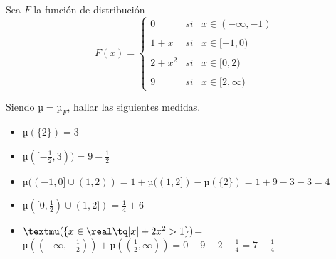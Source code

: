 \begin{problem}
Sea $F$ la función de distribución
\[F(x)=\left\{ \begin{array}{lcc}
             0 &   si  & x \in (-\infty, -1) \\
             \\ 1+x & si & x \in [-1, 0) \\
             \\ 2+x^2 & si & x \in [0, 2) \\
             \\ 9 &  si  & x \in [2, \infty)
             \end{array}
   \right.\]

Siendo $µ=µ_F$, hallar las siguientes medidas.
\solution
\begin{itemize}
\item $µ(\{2\}) = 3 $
\item $µ([-\frac{1}{2}, 3)) = 9 - \frac{1}{2}$
\item $µ((-1,0]\cup (1,2)) = 1 + µ((1,2]) - µ(\{2\}) = 1 + 9 -3 - 3 = 4$
\item $µ([0, \frac{1}{2}) \cup (1, 2]) = \frac{1}{4} + 6$
\item $µ(\{x \in \real \tq |x|+2x^2 > 1\})$=$µ((-\infty, -\frac{1}{2})) + µ((\frac{1}{2}, \infty)) = 0 + 9 - 2 - \frac{1}{4} = 7 - \frac{1}{4}$
\end{itemize}
\end{problem}

